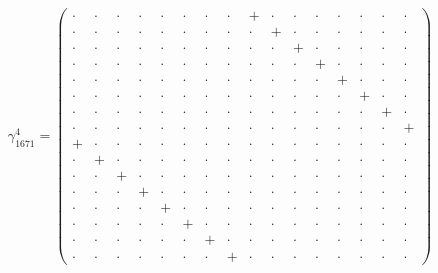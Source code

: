 \documentclass[
  10pt,
]{article}
\begin{document}
\[\gamma_{1671}^4=\left(\begin{smallmatrix} \cdot & \cdot & \cdot & \cdot & \cdot & \cdot & \cdot & \cdot & + & \cdot & \cdot & \cdot & \cdot & \cdot & \cdot & \cdot \\ \cdot & \cdot & \cdot & \cdot & \cdot & \cdot & \cdot & \cdot & \cdot & + & \cdot & \cdot & \cdot & \cdot & \cdot & \cdot \\ \cdot & \cdot & \cdot & \cdot & \cdot & \cdot & \cdot & \cdot & \cdot & \cdot & + & \cdot & \cdot & \cdot & \cdot & \cdot \\ \cdot & \cdot & \cdot & \cdot & \cdot & \cdot & \cdot & \cdot & \cdot & \cdot & \cdot & + & \cdot & \cdot & \cdot & \cdot \\ \cdot & \cdot & \cdot & \cdot & \cdot & \cdot & \cdot & \cdot & \cdot & \cdot & \cdot & \cdot & + & \cdot & \cdot & \cdot \\ \cdot & \cdot & \cdot & \cdot & \cdot & \cdot & \cdot & \cdot & \cdot & \cdot & \cdot & \cdot & \cdot & + & \cdot & \cdot \\ \cdot & \cdot & \cdot & \cdot & \cdot & \cdot & \cdot & \cdot & \cdot & \cdot & \cdot & \cdot & \cdot & \cdot & + & \cdot \\ \cdot & \cdot & \cdot & \cdot & \cdot & \cdot & \cdot & \cdot & \cdot & \cdot & \cdot & \cdot & \cdot & \cdot & \cdot & + \\ + & \cdot & \cdot & \cdot & \cdot & \cdot & \cdot & \cdot & \cdot & \cdot & \cdot & \cdot & \cdot & \cdot & \cdot & \cdot \\ \cdot & + & \cdot & \cdot & \cdot & \cdot & \cdot & \cdot & \cdot & \cdot & \cdot & \cdot & \cdot & \cdot & \cdot & \cdot \\ \cdot & \cdot & + & \cdot & \cdot & \cdot & \cdot & \cdot & \cdot & \cdot & \cdot & \cdot & \cdot & \cdot & \cdot & \cdot \\ \cdot & \cdot & \cdot & + & \cdot & \cdot & \cdot & \cdot & \cdot & \cdot & \cdot & \cdot & \cdot & \cdot & \cdot & \cdot \\ \cdot & \cdot & \cdot & \cdot & + & \cdot & \cdot & \cdot & \cdot & \cdot & \cdot & \cdot & \cdot & \cdot & \cdot & \cdot \\ \cdot & \cdot & \cdot & \cdot & \cdot & + & \cdot & \cdot & \cdot & \cdot & \cdot & \cdot & \cdot & \cdot & \cdot & \cdot \\ \cdot & \cdot & \cdot & \cdot & \cdot & \cdot & + & \cdot & \cdot & \cdot & \cdot & \cdot & \cdot & \cdot & \cdot & \cdot \\ \cdot & \cdot & \cdot & \cdot & \cdot & \cdot & \cdot & + & \cdot & \cdot & \cdot & \cdot & \cdot & \cdot & \cdot & \cdot \end{smallmatrix}\right)\qquad
\]
\end{document}

